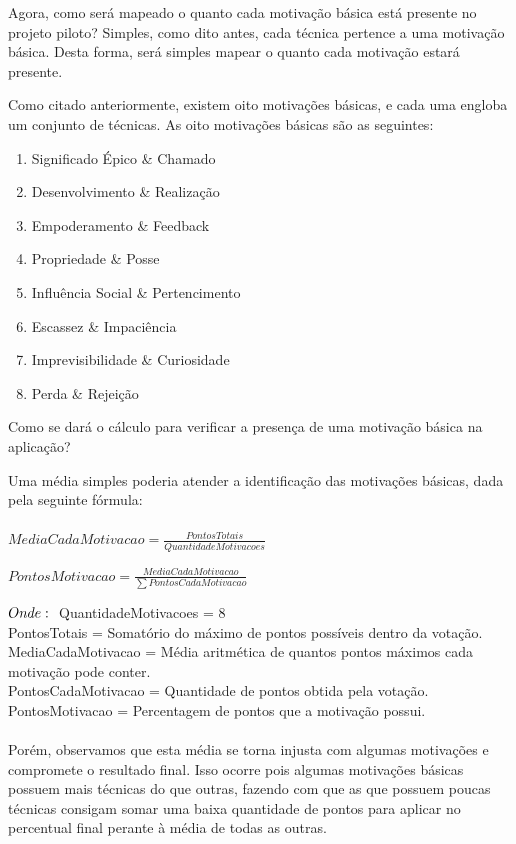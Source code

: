 Agora, como será mapeado o quanto cada motivação básica está presente no projeto piloto? Simples, como dito antes,
cada técnica pertence a uma motivação básica. Desta forma, será simples mapear o quanto cada motivação estará presente.

Como citado anteriormente, existem oito motivações básicas, e cada uma engloba um conjunto de técnicas. As oito motivações básicas são as seguintes:

\begin{enumerate}
    \item Significado Épico \& Chamado
    \item Desenvolvimento \& Realização
    \item Empoderamento \& Feedback
    \item Propriedade \& Posse
    \item Influência Social \& Pertencimento
    \item Escassez \& Impaciência
    \item Imprevisibilidade \& Curiosidade
    \item Perda \& Rejeição
\end{enumerate}

Como se dará o cálculo para verificar a presença de uma motivação básica na aplicação?

Uma média simples poderia atender a identificação das motivações básicas, dada pela seguinte fórmula: \\ \\


$ MediaCadaMotivacao = \frac{PontosTotais}{QuantidadeMotivacoes} $

$ PontosMotivacao = \frac{MediaCadaMotivacao}{\sum PontosCadaMotivacao} $


$Onde:
\\ \\$
QuantidadeMotivacoes = 8
\\ PontosTotais = Somatório do máximo de pontos possíveis dentro da votação.
\\ MediaCadaMotivacao = Média aritmética de quantos pontos máximos cada motivação pode conter.
\\ PontosCadaMotivacao = Quantidade de pontos obtida pela votação.
\\ PontosMotivacao = Percentagem de pontos que a motivação possui. \\ \\


 Porém, observamos que esta média se torna injusta com algumas motivações e compromete o resultado final.
Isso ocorre pois  algumas motivações básicas possuem mais técnicas do que outras, fazendo com que
as que possuem poucas técnicas consigam somar uma baixa quantidade de pontos para aplicar no percentual final perante
à média de todas as outras.

